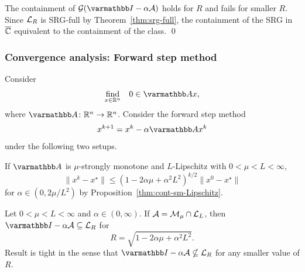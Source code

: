 \documentclass[10pt,mathserif]{beamer}
\begin{document}
\begin{frame}[plain]
\begin{center}
\end{center}
The containment of $\cG(\opI-\alpha\cA)$ holds for $R$ and fails for smaller $R$.
Since ${\mathcal{L}}_R$ is SRG-full by Theorem~\ref{thm:srg-full}, the containment of the SRG in $\overline{\mathbb{C}}$ equivalent to the containment of the class.
\qed
\end{frame}


\begin{frame}
\frametitle{Convergence analysis: Forward step method}
Consider
\[
\begin{array}{ll}
\underset{x\in \reals^n}{\mbox{find}}&0\in \opA x,
\end{array}
\]
where $\opA\colon\reals^n\rightarrow\reals^n$.
Consider the forward step method
\[
x^{k+1}=x^k-\alpha \opA x^k
\]
under the following two setups.

\vspace{0.2in}

If $\opA$ is $\mu$-strongly monotone and $L$-Lipschitz with $0<\mu<L<\infty$,
\[
\|x^k-x^\star\|\le
\left(1-2\alpha\mu+\alpha^2 L^2\right)^{k/2}
\|x^0-x^\star\|
\]
for $\alpha\in (0,2\mu/L^2)$ by Proposition~\ref{thm:cont-sm-Lipschitz}.
\end{frame}





\begin{frame}
\begin{proposition}
\label{thm:cont-sm-Lipschitz}
Let $0<\mu<L<\infty$ and $\alpha\in (0,\infty)$.
If ${\mathcal{A}}=\mathcal{M}_\mu\cap \mathcal{L}_L$,
then $\opI-\alpha \cA\subseteq \cL_R$
for
\[
R= \sqrt{1-2\alpha\mu+\alpha^2 L^2}.
\]
Result is tight in the sense that $\opI-\alpha\cA\nsubseteq \cL_R$ for any smaller value of $R$.
\end{proposition}
\end{frame}
\end{document}
